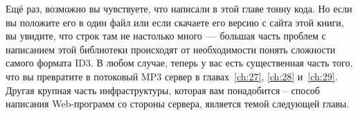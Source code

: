 Ещё раз, возможно вы чувствуете, что написали в этой главе тонну кода. Но если вы положите
его в один файл или если скачаете его версию с сайта этой книги, вы увидите, что строк там
не настолько много~--- большая часть проблем с написанием этой библиотеки происходят от
необходимости понять сложности самого формата ID3. В любом случае, теперь у вас есть
существенная часть того, что вы превратите в потоковый MP3 сервер в главах~\ref{ch:27},
\ref{ch:28} и~\ref{ch:29}. Другая крупная часть инфраструктуры, которая вам понадобится --
способ написания Web-программ со стороны сервера, является темой следующей главы.

